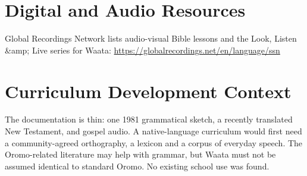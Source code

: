 \documentclass[12pt]{article}
\begin{document}
\section{Digital and Audio Resources}
Global Recordings Network lists audio-visual Bible lessons and the Look, Listen \&amp; Live series for Waata: \url{https://globalrecordings.net/en/language/ssn}

\section{Curriculum Development Context}
The documentation is thin: one 1981 grammatical sketch, a recently translated New Testament, and gospel audio. A native-language curriculum would first need a community-agreed orthography, a lexicon and a corpus of everyday speech. The Oromo-related literature may help with grammar, but Waata must not be assumed identical to standard Oromo. No existing school use was found.
\end{document}
